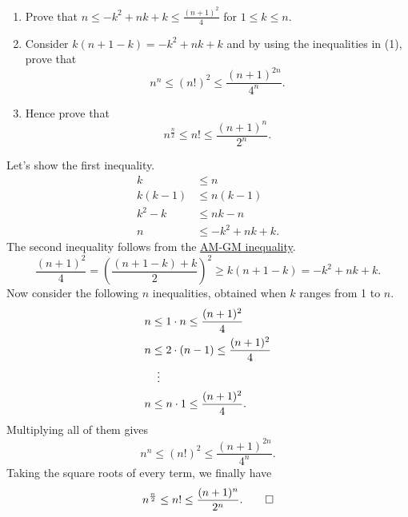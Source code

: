 \begin{question}
    \begin{enumerate}
        \item Prove that $n \leq -k^2 + nk + k \leq \frac{(n + 1)^2}{4}$ for $1
            \leq k \leq n$. 
        
        \item Consider $k(n + 1 - k) = -k^2 + nk + k$ and by using the
            inequalities in (1), prove that 
            \[n^n \leq (n!)^2 \leq \frac{(n + 1)^{2n}}{4^n}.\]
        
        \item Hence prove that 
            \[n^{\frac{n}{2}} \leq n! \leq \frac{(n + 1)^n}{2^n}.\]
    \end{enumerate}
\end{question}
\begin{solution}
    Let's show the first inequality.
    \begin{align*}
        k &\leq n\\
        k(k - 1) &\leq n(k - 1)\\
        k^2 - k &\leq nk - n\\
        n &\leq -k^2 + nk + k.
    \end{align*}
    The second inequality follows from the \hyperref[thm: amgm]{AM-GM inequality}. 
    \[ \frac{(n + 1)^2}{4} = \left( \frac{(n + 1 - k) + k}{2} \right)^2 \geq
    k(n + 1 - k) = -k^2 + nk + k. \]
    Now consider the following $n$ inequalities, obtained when $k$ ranges from
    1 to $n$.
    \begin{align*}
        n &\leq 1 \cdot n \leq \frac{(n + 1)^2}{4}\\
        n &\leq 2 \cdot (n - 1) \leq \frac{(n + 1)^2}{4}\\
        &\vdotswithin{\leq}\\
        n &\leq n \cdot 1 \leq \frac{(n + 1)^2}{4}.
    \end{align*}
    Multiplying all of them gives
    \[ n^n \leq (n!)^2 \leq \frac{(n + 1)^{2n}}{4^n}. \]
    Taking the square roots of every term, we finally have
    \[ n^{\frac{n}{2}} \leq n! \leq \frac{(n + 1)^n}{2^n}. \qedhere \]
\end{solution}
